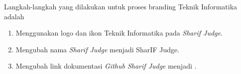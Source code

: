 Langkah-langkah yang dilakukan untuk proses branding Teknik Informatika adalah
\begin{enumerate}
	\item Menggunakan logo dan ikon Teknik Informatika pada \textit{Sharif Judge}.
	\item Mengubah nama \textit{Sharif Judge} menjadi SharIF Judge.
	\item Mengubah link dokumentasi \textit{Github Sharif Judge} menjadi .
\end{enumerate}